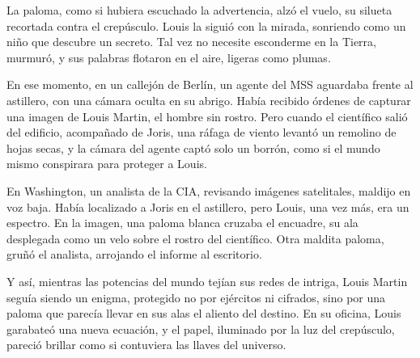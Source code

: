 La paloma, como si hubiera escuchado la advertencia, alzó el vuelo, su silueta recortada contra el crepúsculo. Louis la siguió con la mirada, sonriendo como un niño que descubre un secreto. \glqq Tal vez no necesite esconderme en la Tierra,\grqq~ murmuró, y sus palabras flotaron en el aire, ligeras como plumas.

En ese momento, en un callejón de Berlín, un agente del MSS aguardaba frente al astillero, con una cámara oculta en su abrigo. Había recibido órdenes de capturar una imagen de Louis Martin, el hombre sin rostro. Pero cuando el científico salió del edificio, acompañado de Joris, una ráfaga de viento levantó un remolino de hojas secas, y la cámara del agente captó solo un borrón, como si el mundo mismo conspirara para proteger a Louis.

En Washington, un analista de la CIA, revisando imágenes satelitales, maldijo en voz baja. Había localizado a Joris en el astillero, pero Louis, una vez más, era un espectro. En la imagen, una paloma blanca cruzaba el encuadre, su ala desplegada como un velo sobre el rostro del científico. \glqq Otra maldita paloma,\grqq~ gruñó el analista, arrojando el informe al escritorio.

Y así, mientras las potencias del mundo tejían sus redes de intriga, Louis Martin seguía siendo un enigma, protegido no por ejércitos ni cifrados, sino por una paloma que parecía llevar en sus alas el aliento del destino. En su oficina, Louis garabateó una nueva ecuación, y el papel, iluminado por la luz del crepúsculo, pareció brillar como si contuviera las llaves del universo.
